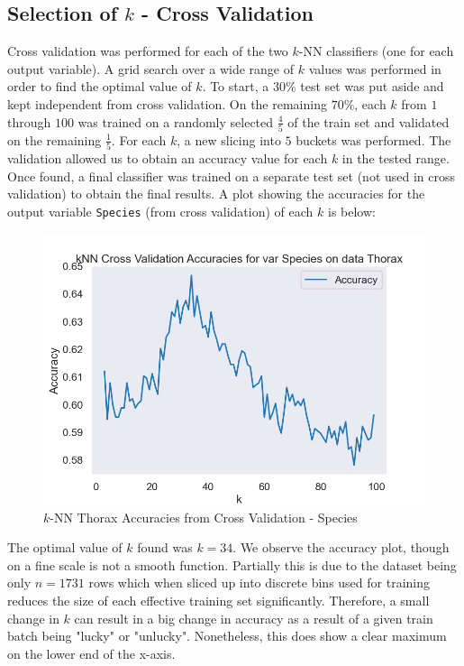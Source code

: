 \documentclass{article}
\begin{document}
\subsection{Selection of $k$ - Cross Validation}

Cross validation was performed for each of the two $k$-NN classifiers (one for each output variable). A grid search over a wide range of $k$ values was performed in order to find the optimal value of $k$. To start, a $30\%$ test set was put aside and kept independent from cross validation. On the remaining $70\%$, each $k$ from $1$ through $100$ was trained on a randomly selected $\frac{4}{5}$ of the train set and validated on the remaining $\frac{1}{5}$. For each $k$, a new slicing into $5$ buckets was performed. The validation allowed us to obtain an accuracy value for each $k$ in the tested range. Once found, a final classifier was trained on a separate test set (not used in cross validation) to obtain the final results. A plot showing the accuracies for the output variable \texttt{Species} (from cross validation) of each $k$ is below:

\begin{figure}[htb]
    \centering
    \includegraphics[width=0.8\columnwidth]{plots/Thorax_knn_accuracies_Species.png}
    \caption{$k$-NN Thorax Accuracies from Cross Validation - Species}
    \label{fig:knn_thorax_cv_accuracies_pop}
\end{figure}

The optimal value of $k$ found was $k = 34$. We observe the accuracy plot, though on a fine scale is not a smooth function. Partially this is due to the dataset being only $n = 1731$ rows which when sliced up into discrete bins used for training reduces the size of each effective training set significantly. Therefore, a small change in $k$ can result in a big change in accuracy as a result of a given train batch being "lucky" or "unlucky". Nonetheless, this does show a clear maximum on the lower end of the x-axis. \\
\end{document}
